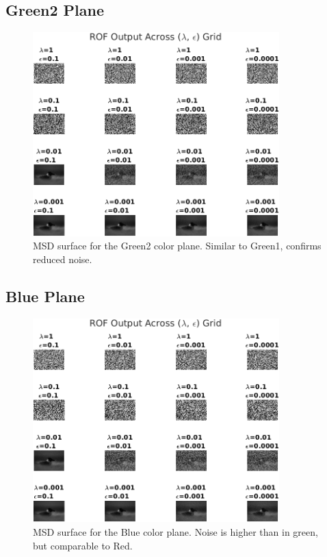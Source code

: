 \documentclass[11pt]{article}
\begin{document}
\subsection*{Green2 Plane}
\begin{figure}[h!]
\centering
\includegraphics[width=0.85\textwidth]{../test/results/rof_grid_plane_G2.png}
\caption{MSD surface for the Green2 color plane. Similar to Green1, confirms reduced noise.}
\end{figure}
\clearpage

\subsection*{Blue Plane}
\begin{figure}[h!]
\centering
\includegraphics[width=0.85\textwidth]{../test/results/rof_grid_plane_B.png}
\caption{MSD surface for the Blue color plane. Noise is higher than in green, but comparable to Red.}
\end{figure}
\clearpage
\end{document}
